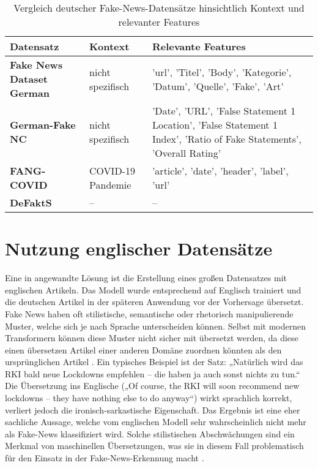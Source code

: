 \begin{table}[ht]
    \centering
    \renewcommand{\arraystretch}{1.3}
    \begin{tabular}{|p{3cm}|p{2cm}|p{8cm}|}
        \hline
        \rowcolor{lightgray} \textbf{Datensatz} & \textbf{Kontext} & \textbf{Relevante Features} \\
        \hline
        \textbf{Fake News Dataset German} & nicht spezifisch & 'url', 'Titel', 'Body', 'Kategorie', 'Datum', 'Quelle', 'Fake', 'Art' \\
        \hline
        \textbf{German-Fake NC} & nicht spezifisch & 'Date', 'URL', 'False Statement 1 Location', 'False Statement 1 Index', 'Ratio of Fake Statements', 'Overall Rating' \\
        \hline
        \textbf{FANG-COVID} & COVID-19 Pandemie & 'article', 'date', 'header', 'label', 'url' \\
        \hline
        \textbf{DeFaktS} & -- &  -- \\
        \hline
    \end{tabular}
    \caption{Vergleich deutscher Fake-News-Datensätze hinsichtlich Kontext und relevanter Features}
    \label{tab:deutsche-fake-news-datensaetze-inhalt}
\end{table}

\section{Nutzung englischer Datensätze} \label{sec:english_datasets}

Eine in \cite{Simone2022} angewandte Lösung ist die Erstellung eines großen Datensatzes mit englischen Artikeln. Das Modell wurde entsprechend auf Englisch 
trainiert und die deutschen Artikel in der späteren Anwendung vor der Vorhersage übersetzt.
Fake News haben oft stilistische, semantische oder rhetorisch manipulierende Muster, welche sich je nach Sprache unterscheiden können.
Selbst mit modernen Transformern können diese Muster nicht sicher mit übersetzt werden, da diese einen übersetzen Artikel einer anderen Domäne zuordnen könnten
als den ursprünglichen Artikel \cite{hong2023disentanglingstructurestylepolitical}. 
Ein typisches Beispiel ist der Satz: „Natürlich wird das RKI bald neue Lockdowns empfehlen – die haben ja auch sonst nichts zu tun.“ 
Die Übersetzung ins Englische („Of course, the RKI will soon recommend new lockdowns – they have nothing else to do anyway“) wirkt sprachlich korrekt, 
verliert jedoch die ironisch-sarkastische Eigenschaft.
Das Ergebnis ist eine eher sachliche Aussage, welche vom englischen Modell sehr wahrscheinlich nicht mehr als Fake-News klassifiziert wird.
Solche stilistischen Abschwächungen sind ein Merkmal von maschinellen Übersetzungen, was sie in diesem Fall problematisch
für den Einsatz in der Fake-News-Erkennung macht \cite{kuehn2024enhancingrhetoricalfigureannotation}.

